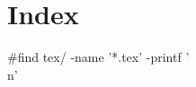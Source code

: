 \documentclass{article}
\begin{document}
\maketitle

\section{Index}
\tableofcontents

#find tex/ -name '*.tex' -printf '\\n'
\end{document}

